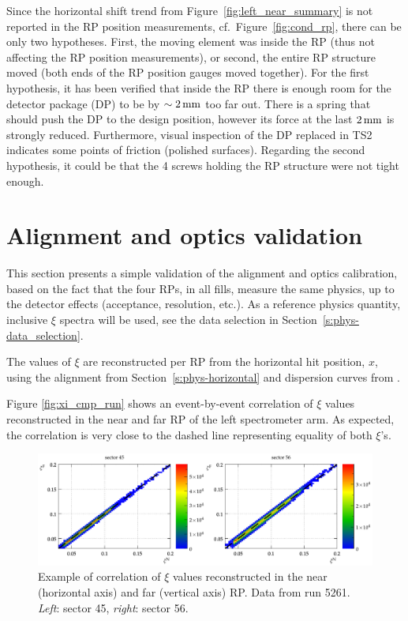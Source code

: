 \documentclass[TOTEM]{cern/cernphprep}
\def\un#1{\,{\rm #1}}
\begin{document}
Since the horizontal shift trend from Figure~\ref{fig:left_near_summary} is not reported in the RP position measurements, cf.~Figure~\ref{fig:cond_rp}, there can be only two hypotheses. First, the moving element was inside the RP (thus not affecting the RP position measurements), or second, the entire RP structure moved (both ends of the RP position gauges moved together). For the first hypothesis, it has been verified that inside the RP there is enough room for the detector package (DP) to be by $\sim 2\un{mm}$ too far out. There is a spring that should push the DP to the design position, however its force at the last $2\un{mm}$ is strongly reduced. Furthermore, visual inspection of the DP replaced in TS2 indicates some points of friction (polished surfaces). Regarding the second hypothesis, it could be that the 4 screws holding the RP structure were not tight enough.



\section{Alignment and optics validation}
\label{s:val}

This section presents a simple validation of the alignment and optics calibration, based on the fact that the four RPs, in all fills, measure the same physics, up to the detector effects (acceptance, resolution, etc.). As a reference physics quantity, inclusive $\xi$ spectra will be used, see the data selection in Section~\ref{s:phys-data_selection}.

The values of $\xi$ are reconstructed per RP from the horizontal hit position, $x$, using the alignment from Section~\ref{s:phys-horizontal} and dispersion curves from \cite{optics_calibration}.

Figure \ref{fig:xi_cmp_run} shows an event-by-event correlation of $\xi$ values reconstructed in the near and far RP of the left spectrometer arm. As expected, the correlation is very close to the dashed line representing equality of both $\xi$'s.


\begin{figure}[h!]
\begin{center}
\includegraphics[width=\hsize]{fig/validation/xi_NF_corr_cmp.pdf}
\caption{%
Example of correlation of $\xi$ values reconstructed in the near (horizontal axis) and far (vertical axis) RP. Data from run 5261. {\it Left}: sector 45, {\it right}: sector 56.
}
\label{fig:xi_NF_cmp}
\end{center}
\end{figure}
\end{document}
